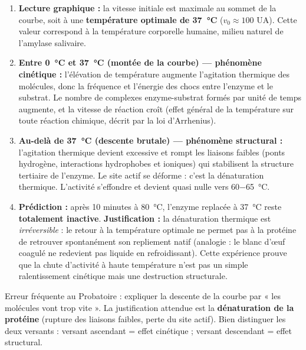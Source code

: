 \documentclass[11pt]{article}
\newcommand{\cle}[1]{{\popxbold\color{popdark}#1}}
\begin{document}
\begin{corrige}
\begin{enumerate}
    \item \textbf{Lecture graphique :} la vitesse initiale est maximale au sommet de la courbe, soit à une \textbf{température optimale de \SI{37}{\celsius}} ($v_0 \approx 100$ UA). Cette valeur correspond à la température corporelle humaine, milieu naturel de l'amylase salivaire.
    \item \textbf{Entre \SI{0}{\celsius} et \SI{37}{\celsius} (montée de la courbe) — phénomène cinétique :} l'élévation de température augmente l'agitation thermique des molécules, donc la fréquence et l'énergie des chocs entre l'enzyme et le substrat. Le nombre de complexes enzyme-substrat formés par unité de temps augmente, et la vitesse de réaction croît (effet général de la température sur toute réaction chimique, décrit par la loi d'Arrhenius).
    \item \textbf{Au-delà de \SI{37}{\celsius} (descente brutale) — phénomène structural :} l'agitation thermique devient excessive et rompt les liaisons faibles (ponts hydrogène, interactions hydrophobes et ioniques) qui stabilisent la structure tertiaire de l'enzyme. Le site actif se déforme : c'est la \cle{dénaturation thermique}. L'activité s'effondre et devient quasi nulle vers \SI{60-65}{\celsius}.
    \item \textbf{Prédiction :} après 10 minutes à \SI{80}{\celsius}, l'enzyme replacée à \SI{37}{\celsius} reste \textbf{totalement inactive}. \textbf{Justification :} la dénaturation thermique est \emph{irréversible} : le retour à la température optimale ne permet pas à la protéine de retrouver spontanément son repliement natif (analogie : le blanc d'œuf coagulé ne redevient pas liquide en refroidissant). Cette expérience prouve que la chute d'activité à haute température n'est pas un simple ralentissement cinétique mais une destruction structurale.
\end{enumerate}
\end{corrige}

\begin{attention}
Erreur fréquente au Probatoire : expliquer la descente de la courbe par « les molécules vont trop vite ». La justification attendue est la \textbf{dénaturation de la protéine} (rupture des liaisons faibles, perte du site actif). Bien distinguer les deux versants : versant ascendant = effet cinétique ; versant descendant = effet structural.
\end{attention}
\end{document}
